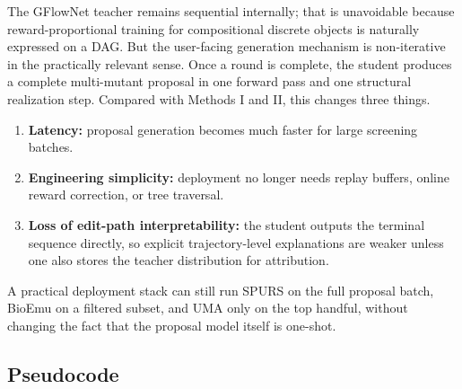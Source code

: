 \documentclass[11pt]{article}
\begin{document}
The GFlowNet teacher remains sequential internally; that is unavoidable because reward-proportional training for compositional discrete objects is naturally expressed on a DAG. But the user-facing generation mechanism is non-iterative in the practically relevant sense. Once a round is complete, the student produces a complete multi-mutant proposal in one forward pass and one structural realization step. Compared with Methods I and II, this changes three things.
\begin{enumerate}[leftmargin=1.5em]
    \item \textbf{Latency:} proposal generation becomes much faster for large screening batches.
    \item \textbf{Engineering simplicity:} deployment no longer needs replay buffers, online reward correction, or tree traversal.
    \item \textbf{Loss of edit-path interpretability:} the student outputs the terminal sequence directly, so explicit trajectory-level explanations are weaker unless one also stores the teacher distribution for attribution.
\end{enumerate}
A practical deployment stack can still run SPURS on the full proposal batch, BioEmu on a filtered subset, and UMA only on the top handful, without changing the fact that the proposal model itself is one-shot.

\subsection{Pseudocode}
\end{document}
